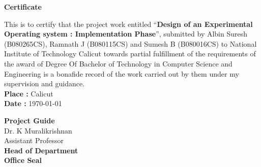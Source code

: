\newpage
\pagestyle{empty}

\begin{center}
\Large\bf{Certificate}
\end{center}

This is to certify that the project work entitled ``\textbf{Design of an Experimental Operating system : Implementation Phase}'', submitted by Albin Suresh (B080265CS), Ramnath J (B080115CS) and Sumesh B (B080016CS) to National Institute of Technology Calicut towards partial fulfillment of the requirements of the award of Degree Of Bachelor of Technology in Computer Science and Engineering is a bonafide record of the work carried out by them under my supervision and guidance.\\

\noindent
\textbf{Place :} Calicut \\
\textbf{Date :} \today \\

\begin{flushright}
\textbf{Project Guide}\\
Dr. K Muralikrishnan\\
Assistant Professor\\
\vspace{4cm}
\textbf{Head of Department} \\
\vspace{4cm}
{ \bf Office Seal} \\
\end{flushright}
